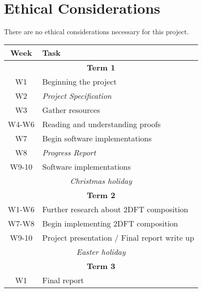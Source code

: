 \documentclass[12pt, a4paper]{article}
\begin{document}
\section{Ethical Considerations}
There are no ethical considerations necessary for this project.


\begin{center}
    \begin{tabular}{| c | p{8cm} |}
        \hline
        \textbf{Week} & \textbf{Task} \\
        \hline
        \multicolumn{2}{|c|}{\textbf{Term 1}} \\
        \hline
        W1 & Beginning the project \\
        W2 & \textit{Project Specification} \\
        W3 & Gather resources \\
        W4-W6 & Reading and understanding proofs \\
        W7 & Begin software implementations \\
        W8 & \textit{Progress Report} \\
        W9-10 & Software implementations \\
        \hline
        \multicolumn{2}{|c|}{\textit{Christmas holiday}}\\
        \hline
        \multicolumn{2}{|c|}{\textbf{Term 2}} \\
        \hline
        W1-W6 & Further research about 2DFT composition \\
        W7-W8 & Begin implementing 2DFT composition \\
        W9-10 & Project presentation / Final report write up \\
        \hline
        \multicolumn{2}{|c|}{\textit{Easter holiday}}\\
        \hline
        \multicolumn{2}{|c|}{\textbf{Term 3}}\\
        \hline
        W1 & Final report\\
        \hline
    \end{tabular}
\end{center}
\end{document}
